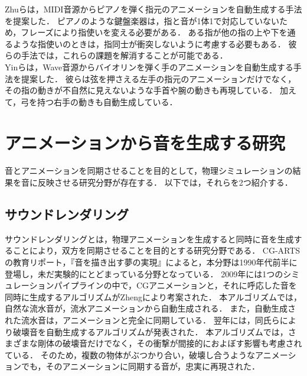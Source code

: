 Zhuら\cite{piano}は，MIDI音源からピアノを弾く指元のアニメーションを自動生成する手法を提案した．
ピアノのような鍵盤楽器は，指と音が1体1で対応していないため，フレーズにより指使いを変える必要がある．
ある指が他の指の上や下を通るような指使いのときは，指同士が衝突しないように考慮する必要もある．
彼らの手法では，これらの課題を解消することが可能である．\\
\indent
Yin\cite{violin}らは，Wave音源からバイオリンを弾く手のアニメーションを自動生成する手法を提案した．
彼らは弦を押さえる左手の指元のアニメーションだけでなく，その指の動きが不自然に見えないような手首や腕の動きも再現している．
加えて，弓を持つ右手の動きも自動生成している．
%
\section{アニメーションから音を生成する研究}\label{sec:generate_sound}
音とアニメーションを同期させることを目的として，物理シミュレーションの結果を音に反映させる研究分野が存在する．
以下では，それらを2つ紹介する．\\
%
\subsection{サウンドレンダリング}
サウンドレンダリングとは，物理アニメーションを生成すると同時に音を生成することにより，双方を同期させることを目的とする研究分野である．
CG-ARTSの教育リポート，『音を描き出す夢の実現』\cite{CG-ARTS}によると，本分野は1990年代前半に登場し，未だ実験的にとどまっている分野となっている．
2009年には1つのシミュレーションパイプラインの中で，CGアニメーションと，それに呼応した音を同時に生成するアルゴリズム\cite{james1}がZhengにより考案された．
本アルゴリズムでは，自然な流水音が，流水アニメーションから自動生成される．
また，自動生成された流水音は，アニメーションと完全に同期している．
%
翌年には，同氏らにより破壊音を自動生成するアルゴリズム\cite{james2}が発表された．
本アルゴリズムでは，さまざまな剛体の破壊音だけでなく，その衝撃が間接的におよぼす影響も考慮されている．
そのため，複数の物体がぶつかり合い，破壊し合うようなアニメーションでも，そのアニメーションに同期する音が，忠実に再現された．
%
